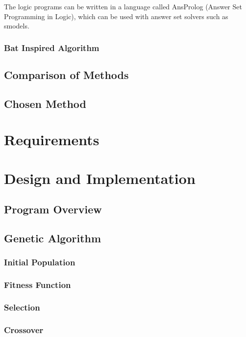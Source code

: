 \documentclass[a4paper, 12pt]{report}
\begin{document}
The logic programs can be written in a language called AnsProlog (Answer Set
Programming in Logic), which can be used with answer set solvers such as
smodels.

\subsection{Bat Inspired Algorithm}

\section{Comparison of Methods}

\section{Chosen Method}

\chapter{Requirements}

\chapter{Design and Implementation}

\section{Program Overview}

\section{Genetic Algorithm}

\subsection{Initial Population}

\subsection{Fitness Function}

\subsection{Selection}

\subsection{Crossover}
\end{document}
